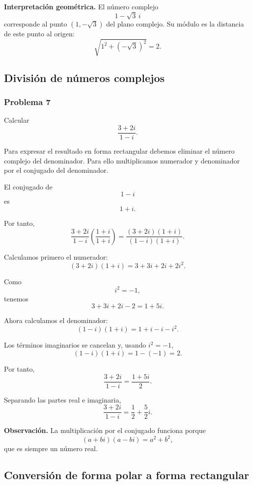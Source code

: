 \documentclass[12pt]{article}
\begin{document}
\medskip

\noindent
\textbf{Interpretación geométrica.}
El número complejo
\[
1-\sqrt3\,i
\]
corresponde al punto $(1,-\sqrt3)$ del plano complejo. Su módulo es la
distancia de este punto al origen:
\[
\sqrt{1^2+(-\sqrt3)^2}=2.
\]

\subsection{División de números complejos}

\subsubsection*{Problema 7}

Calcular
\[
\frac{3+2i}{1-i}.
\]

Para expresar el resultado en forma rectangular debemos eliminar el número
complejo del denominador. Para ello multiplicamos numerador y denominador
por el conjugado del denominador.

El conjugado de
\[
1-i
\]
es
\[
1+i.
\]

Por tanto,
\[
\frac{3+2i}{1-i}
\left(\frac{1+i}{1+i}\right)
=
\frac{(3+2i)(1+i)}{(1-i)(1+i)}.
\]

Calculamos primero el numerador:
\[
(3+2i)(1+i)
=
3+3i+2i+2i^2.
\]

Como
\[
i^2=-1,
\]
tenemos
\[
3+3i+2i-2
=
1+5i.
\]

Ahora calculamos el denominador:
\[
(1-i)(1+i)
=
1+i-i-i^2.
\]

Los términos imaginarios se cancelan y, usando $i^2=-1$,
\[
(1-i)(1+i)
=
1-(-1)
=
2.
\]

Por tanto,
\[
\frac{3+2i}{1-i}
=
\frac{1+5i}{2}.
\]

Separando las partes real e imaginaria,
\[
\boxed{
\frac{3+2i}{1-i}
=
\frac12+\frac52i
}.
\]

\medskip

\noindent
\textbf{Observación.}
La multiplicación por el conjugado funciona porque
\[
(a+bi)(a-bi)=a^2+b^2,
\]
que es siempre un número real.

\subsection{Conversión de forma polar a forma rectangular}
\end{document}
